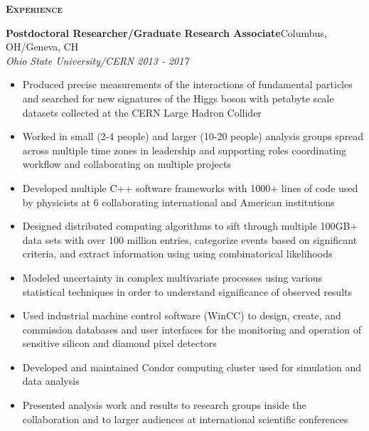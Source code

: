 \documentclass[line]{letter}
\begin{document}
{\vspace{3pt} \Large \textsc{\textbf{Experience}}}
\begin{addmargin}[1em]{1em}
{\large {\bf Postdoctoral Researcher/Graduate Research Associate}\hfill Columbus, OH/Geneva, CH\vspace{1mm}}\\
{\large \it Ohio State University/CERN \hfill  2013 - 2017} \\
\vspace{-6mm}
\begin{itemize}[leftmargin=5mm]
\item Produced precise measurements of the interactions of fundamental particles and searched for new signatures of the Higgs boson with petabyte scale datasets collected at the CERN Large Hadron Collider
\item Worked in small (2-4 people) and larger (10-20 people) analysis groups spread across multiple time zones in leadership and supporting roles coordinating workflow and collaborating on multiple projects
\item Developed multiple C++ software frameworks with 1000+ lines of code used by physicists at 6 collaborating international and American institutions
\item Designed distributed computing algorithms to sift through multiple 100GB+ data sets with over 100 million entries, categorize events based on significant criteria, and extract information using using combinatorical likelihoods 
\item Modeled uncertainty in complex multivariate processes using various statistical techniques in order to understand significance of observed results
\item Used industrial machine control software (WinCC) to design, create, and commission databases and user interfaces for the monitoring and operation of sensitive silicon and diamond pixel detectors
\item Developed and maintained Condor computing cluster used for simulation and data analysis
\item Presented analysis work and results to research groups inside the collaboration and to larger audiences at international scientific conferences
\end{itemize}


\end{addmargin}
\end{document}
